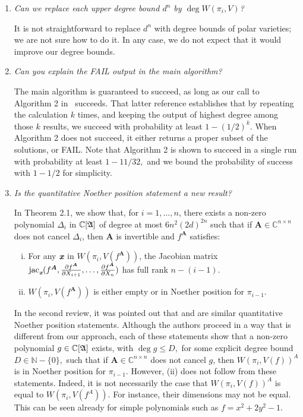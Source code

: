 \documentclass{article}
\def\mA{{\bm A}}
\def\xb{\textit{\textbf{x}}}
\def\C{\mathbb{C}}
\DeclareMathOperator{\jac}{jac}
\def\pa{\partial}
\def\D{\Delta}
\def\A{\frak{A}}
\begin{document}
\begin{enumerate}
    \item \textit{Can we replace each upper degree bound $d^n$ by $\deg W(\pi_i,V)$? }
    
    It is not straightforward to replace $d^n$ with degree bounds of polar varieties; we are not sure how to do it. In any case, we do not expect that it would improve our degree bounds.  
    
    \item \textit{Can you explain the FAIL output in the main algorithm?}
    
    The main algorithm is guaranteed to succeed, as long as our call to Algorithm 2 in~\cite{SH} succeeds. That latter reference establishes that by repeating the calculation $k$ times, and keeping the output of highest degree among those $k$ results, we succeed with probability at least $1-(1/2)^k$. When Algorithm 2 does not succeed, it either returns a proper subset of the solutions, or FAIL. Note that Algorithm 2 is shown to succeed in a single run with  probability at least $1-11/32,$ and we bound the probability of success with $1-1/2$ for simplicity. 
        
        
    \item\textit{ Is the quantitative Noether position statement a new result? }
    
    In Theorem 2.1, we show that, for $i=1,\dots,n$, there exists a non-zero polynomial $\D_i$ in $\C[\A]$ of degree at most $6n^2(2d)^{2n}$ such that if $\mA \in \C^{n\times n}$ does not cancel $\D_i$, then $\mA$ is invertible and $f^\mA$ satisfies:
%
\begin{enumerate}[(i)]
\item For any $\xb$ in $W(\pi_i,V(f^{\mA}))$, the Jacobian matrix
  $\jac_\xb(f^{\mA},\frac{\pa f^{\mA}}{\pa
  X_{i+1}},\hdots,\frac{\pa f^{\mA}}{\pa X_n})$ has full rank $n-(i-1)$.

\smallskip

\item $W(\pi_i,V(f^{\mA}))$ is either empty or in Noether position for
  $\pi_{i-1}$.
\end{enumerate}

In the second review, it was pointed out that \cite[Lemma 5]{JeSa10} and \cite[Proposition 4.5]{SharpEstimatesForTheEffectiveN} are similar quantitative Noether position statements. Although the authors proceed in a way that is different from our approach, each of these statements show that a non-zero polynomial $g \in \C[\A]$ exists, with $\deg g \leq D,$ for some explicit degree bound $D \in \mathbb{N}-\{0\},$
such that if $\mA \in \C^{n \times n}$ does not cancel $g$, then $W(\pi_i,V(f))^A$ is in Noether position for $\pi_{i-1}.$ However, (ii) does not follow from these statements. Indeed, it is not necessarily the case that $W(\pi_i,V(f))^A$ is equal to $W(\pi_i,V(f^A))$. For instance, their dimensions may not be equal. This can be seen already for simple polynomials such as $f = x^2 + 2y^2-1$. 
\end{enumerate}


\newpage 











\end{document}
